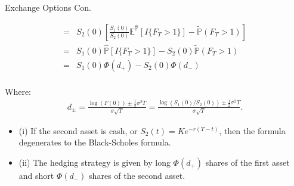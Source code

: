 \documentclass{beamer}
\begin{document}
\begin{frame}{Exchange Options Con.}
    
    {\footnotesize \footnotesize   
    \begin{align*}
        = &  S_2(0) \left[ \frac{S_1(0)}{S_2(0)}\mathbb{E}^{\hat{\mathbb{P}}}[ I{\{F_T > 1\}}] 
        - \tilde{\mathbb{P}}(F_T > 1)\right] \\
        = & S_1(0)\hat{\mathbb{P}}[ I{\{F_T > 1\}}] 
        - S_2(0)\tilde{\mathbb{P}}(F_T > 1) \\
        = & S_1(0) \Phi (d_+) - S_2(0) \Phi (d_-) \\
    \end{align*}
    \par Where:
    \begin{align*}
        d_\pm = \frac{\log(F(0)) \pm \frac{1}{2} \sigma^2 T}{\sigma \sqrt{T}} 
        = \frac{\log(S_1(0)/S_2(0)) \pm \frac{1}{2} \sigma^2 T}{\sigma \sqrt{T}}.
    \end{align*}\pause
    \begin{itemize}
        \item (i) If the second asset is cash, or \( S_2(t) = Ke^{-r(T-t)} \), 
        then the formula degenerates to the Black-Scholes formula.
        \item (ii) The hedging strategy is given by long \( \Phi(d_+) \) 
        shares of the first asset and short \( \Phi(d_-) \) shares of the second asset.
    \end{itemize}
    }
    
\end{frame}
\end{document}
